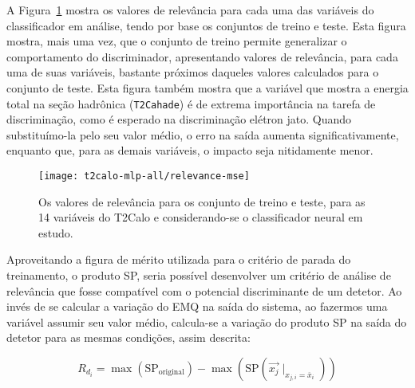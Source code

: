 A Figura~\ref{fig:t2calo-mlp-all-relevance} mostra os valores de relevância
para cada uma das variáveis do classificador em análise, tendo por base os
conjuntos de treino e teste. Esta figura mostra, mais uma vez, que o conjunto
de treino permite generalizar o comportamento do discriminador, apresentando
valores de relevância, para cada uma de suas variáveis, bastante próximos
daqueles valores calculados para o conjunto de teste. Esta figura também
mostra que a variável que mostra a energia total na seção hadrônica
(\texttt{T2Cahade}) é de extrema importância na tarefa de discriminação, como
é esperado na discriminação elétron jato. Quando substituímo-la pelo seu valor
médio, o erro na saída aumenta significativamente, enquanto que, para as
demais variáveis, o impacto seja nitidamente menor.

\begin{figure}
\begin{center}
\texttt{[image: t2calo-mlp-all/relevance-mse]}
\end{center}
\caption{Os valores de relevância para os conjunto de treino e
teste, para as 14 variáveis do T2Calo e considerando-se o classificador neural
em estudo.}
\label{fig:t2calo-mlp-all-relevance}
\end{figure}

Aproveitando a figura de mérito utilizada para o critério de parada do
treinamento, o produto SP, seria possível desenvolver um critério de análise
de relevância que fosse compatível com o potencial discriminante de um
detetor. Ao invés de se calcular a variação do EMQ na saída do sistema, ao
fazermos uma variável assumir seu valor médio, calcula-se a variação do
produto SP na saída do detetor para as mesmas condições, assim descrita:

\begin{equation}
R_{d_i} = \max(\text{SP}_{\text{original}}) - \max(\text{SP}(\overrightarrow{x_j}\mid_{x_{j,i} = \overline{x}_i}))
\label{eq:relevance-sp}
\end{equation}

